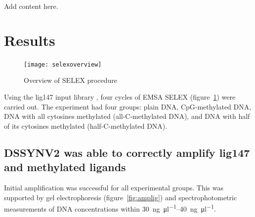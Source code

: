 \documentclass[parskip=full, numbers=noenddot]{scrreprt}
\begin{document}
Add content here.

\section{Results}
\label{sec:emsaselex_results}

\begin{figure}[htpb]
  \centering
  \texttt{[image: selexoverview]}
  \caption{Overview of SELEX procedure}
  \label{fig:selex}
\end{figure}

Using the lig147 input library \citep{zhu_interaction_2018}, four cycles of EMSA SELEX (figure~\ref{fig:selex}) were carried out.  The experiment had four groups: plain DNA, CpG-methylated DNA, DNA with all cytosines methylated (all-C-methylated DNA), and DNA with half of its cytosines methylated (half-C-methylated DNA).

\subsection{DSSYNV2 was able to correctly amplify lig147 and methylated ligands}
\label{ssec:amplig}


Initial amplification was successful for all experimental groups. This was supported by gel electrophoresis (figure~\ref{fig:amplig}) and spectrophotometric measurements of DNA concentrations within \SIrange{30}{40}{\nano\gram\per\micro\litre}.
\end{document}

